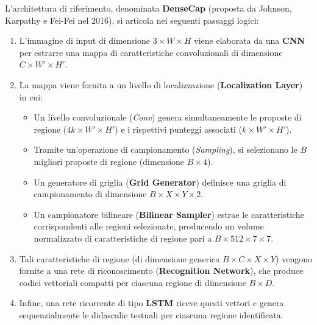 ﻿\documentclass[11pt, a4paper]{article}
\begin{document}
L'architettura di riferimento, denominata \textbf{DenseCap} (proposta da Johnson, Karpathy e Fei-Fei nel 2016), si articola nei seguenti passaggi logici:
\begin{enumerate}
    \item L'immagine di input di dimensione $3 \times W \times H$ viene elaborata da una \textbf{CNN} per estrarre una mappa di caratteristiche convoluzionali di dimensione $C \times W' \times H'$.
    \item La mappa viene fornita a un livello di localizzazione (\textbf{Localization Layer}) in cui:
    \begin{itemize}
        \item Un livello convoluzionale (\emph{Conv}) genera simultaneamente le proposte di regione ($4k \times W' \times H'$) e i rispettivi punteggi associati ($k \times W' \times H'$).
        \item Tramite un'operazione di campionamento (\emph{Sampling}), si selezionano le $B$ migliori proposte di regione (dimensione $B \times 4$).
        \item Un generatore di griglia (\textbf{Grid Generator}) definisce una griglia di campionamento di dimensione $B \times X \times Y \times 2$.
        \item Un campionatore bilineare (\textbf{Bilinear Sampler}) estrae le caratteristiche corrispondenti alle regioni selezionate, producendo un volume normalizzato di caratteristiche di regione pari a $B \times 512 \times 7 \times 7$.
    \end{itemize}
    \item Tali caratteristiche di regione (di dimensione generica $B \times C \times X \times Y$) vengono fornite a una rete di riconoscimento (\textbf{Recognition Network}), che produce codici vettoriali compatti per ciascuna regione di dimensione $B \times D$.
    \item Infine, una rete ricorrente di tipo \textbf{LSTM} riceve questi vettori e genera sequenzialmente le didascalie testuali per ciascuna regione identificata.
\end{enumerate}



\newpage
\end{document}
